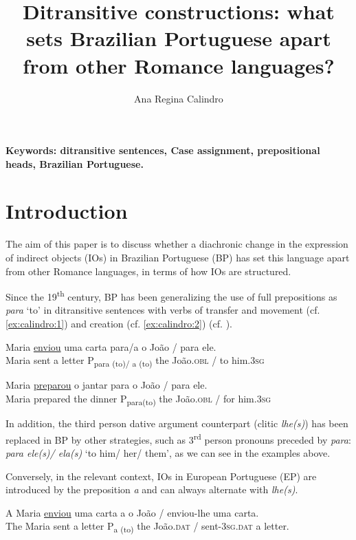 \documentclass[output=paper,colorlinks,citecolor=brown]{./langscibook}
\author{Ana Regina Calindro\affiliation{Federal University of Rio de Janeiro (UFRJ)}}
\title{Ditransitive constructions: what sets Brazilian Portuguese apart from other Romance languages?}
\begin{document}
\maketitle 

\textbf{Keywords: ditransitive sentences, Case assignment, prepositional heads, {Brazilian Portuguese}.}

\section{Introduction}\label{sec:calindro:1}

The aim of this paper is to discuss whether a diachronic change in the expression of indirect objects (IOs) in Brazilian Portuguese (BP) has set this language apart from other Romance languages, in terms of how IOs are structured.

Since the 19\textsuperscript{th} century, BP has been generalizing the use of full prepositions as \textit{para} ‘to’ in ditransitive sentences with verbs of transfer and movement (cf. \ref{ex:calindro:1}) and creation (cf. \ref{ex:calindro:2}) (cf. \citealt{Freire2005, TorresMoraisBerlinck2006, TorresMoraisSalles2010}).

\ea%
    \label{ex:calindro:1}
    \gll Maria \underline{enviou}  uma carta  {para/a}   {o} {João}  / {para} {ele.} \\
     Maria sent       a letter      P{\textsubscript{para (to)/ a (to)}}   the João.\textsc{obl}  / to him.\textsc{3sg}  \\
    \z

\ea%
    \label{ex:calindro:2}
    \gll Maria     \underline{preparou}  o jantar        {para}    {o} {João}  / {para} {ele.}\\
    Maria     prepared  the dinner    P\textsubscript{para(to)} the João.\textsc{obl} / for him.\textsc{3sg} \\
    \z

In addition, the third person dative argument counterpart (clitic \textit{lhe(s)}) has been replaced in BP by other strategies, such as 3\textsuperscript{rd} person pronouns preceded by \textit{para}:  \textit{para ele(s)/ ela(s)} ‘to him/ her/ them’, as we can see in the examples above.

Conversely, in the relevant context, IOs in European Portuguese (EP) are introduced by the preposition \textit{a} and can always alternate with \textit{lhe(s)}.

\ea%
    \label{ex:calindro:3}
    \gll A    Maria \underline{enviou} uma carta a o {João}            / enviou-{lhe}          uma carta.\\
    The Maria sent     a letter      P{\textsubscript{a (to)}} the João.\textsc{dat}  / sent-\textsc{3sg.dat}  a letter.\\
    \z
\end{document}
